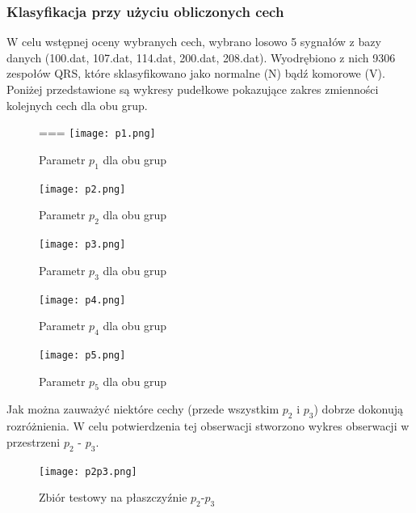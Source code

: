 \documentclass[[10pt,a4paper]{article}
\begin{document}
\subsubsection{Klasyfikacja przy użyciu obliczonych cech}
W celu wstępnej oceny wybranych cech, wybrano losowo 5 sygnałów z bazy danych (100.dat, 107.dat, 114.dat, 200.dat, 208.dat). Wyodrębiono z nich 9306 zespołów QRS, które sklasyfikowano jako normalne (N) bądź komorowe (V). Poniżej przedstawione są wykresy pudełkowe pokazujące zakres zmienności kolejnych cech dla obu grup.

\begin{figure}[H]
	\begin{center}
===		\texttt{[image: p1.png]}
		\caption{Parametr $p_1$ dla obu grup}
	\end{center}
\end{figure}

\begin{figure}[H]
	\begin{center}
		\texttt{[image: p2.png]}
		\caption{Parametr $p_2$ dla obu grup}
	\end{center}
\end{figure}

\begin{figure}[H]
	\begin{center}
		\texttt{[image: p3.png]}
		\caption{Parametr $p_3$ dla obu grup}
	\end{center}
\end{figure}

\begin{figure}[H]
	\begin{center}
		\texttt{[image: p4.png]}
		\caption{Parametr $p_4$ dla obu grup}
	\end{center}
\end{figure}

\begin{figure}[H]
	\begin{center}
		\texttt{[image: p5.png]}
		\caption{Parametr $p_5$ dla obu grup}
	\end{center}
\end{figure}

Jak można zauważyć niektóre cechy (przede wszystkim $p_2$ i $p_3$) dobrze dokonują rozróżnienia. W celu potwierdzenia tej obserwacji stworzono wykres obserwacji w przestrzeni $p_2$ - $p_3$.

\begin{figure}[H]
	\begin{center}
		\texttt{[image: p2p3.png]}
		\caption{Zbiór testowy na płaszczyźnie $p_2$-$p_3$}
	\end{center}
\end{figure}
\end{document}
